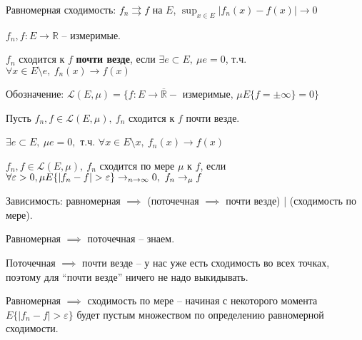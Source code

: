 Равномерная сходимость: $f_n \rightrightarrows f$ на $E$, $\sup_{x \in E} |f_n(x) - f(x)| \rightarrow 0$

\begin{definition}
    $f_n, f: E \rightarrow \mathbb{R}$ -- измеримые.

    $f_n$ сходится к $f$ \textbf{почти везде}, если $\exists e \subset E, \ \mu e = 0$, т.ч. $\forall x \in E \setminus e, \ f_n(x) \rightarrow f(x)$

    \begin{remark}
        Обозначение: $\mathscr{L}(E, \mu) = \{ f: E \rightarrow \overline{\mathbb{R}} - \text{ измеримые, } \mu E\{ f = \pm \infty\} = 0\}$
    \end{remark}

    Пусть $f_n, f \in \mathscr{L}(E, \mu), \ f_n$ сходится к $f$ почти везде.

    $\exists e \subset E, \ \mu e = 0, $ т.ч. $\forall x \in E \setminus x, \ f_n(x) \rightarrow f(x)$
\end{definition}


\begin{definition}
    $f_n, f \in \mathscr{L}(E, \mu), \ f_n$ сходится по мере $\mu$ к $f$, если $\forall \varepsilon > 0, \\ \mu E \{ | f_n - f | > \varepsilon \} \rightarrow_{n \rightarrow \infty} 0, \ f_n \rightarrow_{\mu} f$
\end{definition}

\begin{remark}
    Зависимость: равномерная $\implies$ (поточечная $\implies$ почти везде) | (сходимость по мере).

    Равномерная $\implies$ поточечная -- знаем.

    Поточечная $\implies$ почти везде -- у нас уже есть сходимость во всех точках, поэтому для ``почти везде'' ничего не надо выкидывать.

    Равномерная $\implies$ сходимость по мере -- начиная с некоторого момента $E\{|f_n - f| > \varepsilon \}$ будет пустым множеством по определению равномерной сходимости.
\end{remark}

